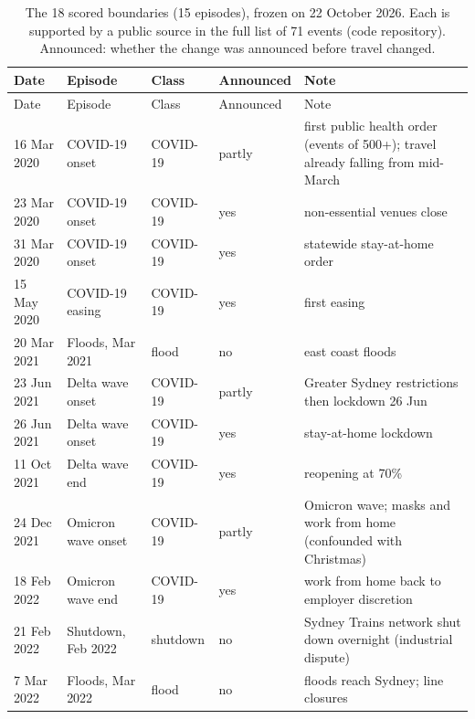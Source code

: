 {\footnotesize\setlength{\tabcolsep}{4pt}
\begin{longtable}{@{}lllll@{}}
\caption{The 18 scored boundaries (15 episodes), frozen on 22 October 2026. Each is supported by a public source in the full list of 71 events (code repository). Announced: whether the change was announced before travel changed.}\label{tab:events}\\
\toprule
Date & Episode & Class & Announced & Note \\
\midrule
\endfirsthead
\toprule
Date & Episode & Class & Announced & Note \\
\midrule
\endhead
16 Mar 2020 & COVID-19 onset & COVID-19 & partly & \parbox[t]{4.9cm}{\raggedright first public health order (events of 500+); travel already falling from mid-March\strut} \\
23 Mar 2020 & COVID-19 onset & COVID-19 & yes & \parbox[t]{4.9cm}{\raggedright non-essential venues close\strut} \\
31 Mar 2020 & COVID-19 onset & COVID-19 & yes & \parbox[t]{4.9cm}{\raggedright statewide stay-at-home order\strut} \\
15 May 2020 & COVID-19 easing & COVID-19 & yes & \parbox[t]{4.9cm}{\raggedright first easing\strut} \\
20 Mar 2021 & Floods, Mar 2021 & flood & no & \parbox[t]{4.9cm}{\raggedright east coast floods\strut} \\
23 Jun 2021 & Delta wave onset & COVID-19 & partly & \parbox[t]{4.9cm}{\raggedright Greater Sydney restrictions then lockdown 26 Jun\strut} \\
26 Jun 2021 & Delta wave onset & COVID-19 & yes & \parbox[t]{4.9cm}{\raggedright stay-at-home lockdown\strut} \\
11 Oct 2021 & Delta wave end & COVID-19 & yes & \parbox[t]{4.9cm}{\raggedright reopening at 70\%\strut} \\
24 Dec 2021 & Omicron wave onset & COVID-19 & partly & \parbox[t]{4.9cm}{\raggedright Omicron wave; masks and work from home (confounded with Christmas)\strut} \\
18 Feb 2022 & Omicron wave end & COVID-19 & yes & \parbox[t]{4.9cm}{\raggedright work from home back to employer discretion\strut} \\
21 Feb 2022 & Shutdown, Feb 2022 & shutdown & no & \parbox[t]{4.9cm}{\raggedright Sydney Trains network shut down overnight (industrial dispute)\strut} \\
7 Mar 2022 & Floods, Mar 2022 & flood & no & \parbox[t]{4.9cm}{\raggedright floods reach Sydney; line closures\strut} \\

\end{longtable}}

